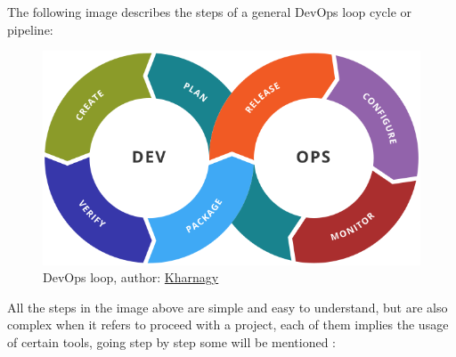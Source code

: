 \documentclass{article}
\begin{document}
The following image describes the steps of a general DevOps loop cycle or pipeline: 
\begin{figure}[H]
    \centering
    \includegraphics[scale=0.2]{devops_loop}
    \caption{DevOps loop, author:
    \href{https://commons.wikimedia.org/wiki/File:Devops-toolchain.svg}{Kharnagy}}
\end{figure}
All the steps in the image above are simple and easy to understand, but are also complex when it refers to proceed with a project, each of them implies the usage of certain tools, going step by step some will be mentioned :
\end{document}
